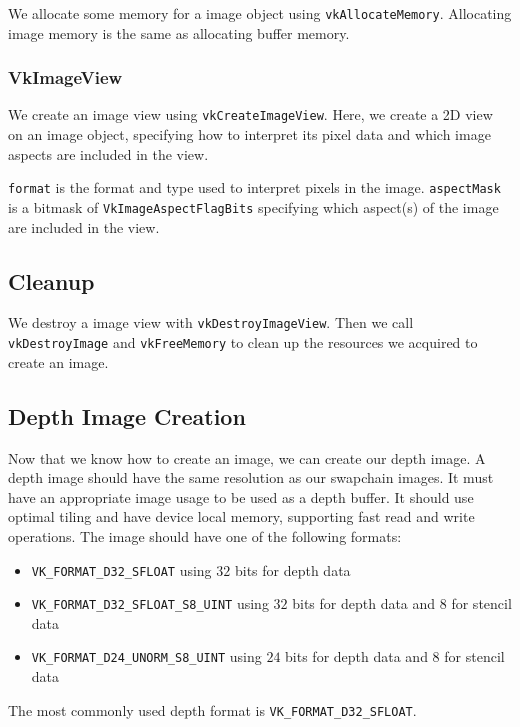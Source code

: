 We allocate some memory for a image object using \texttt{vkAllocateMemory}.
Allocating image memory is the same as allocating buffer memory.

\begin{minipage}{\linewidth}{\noindent}
    
\end{minipage}

\subsubsection{VkImageView}

We create an image view using \texttt{vkCreateImageView}.
Here, we create a 2D view on an image object, specifying
how to interpret its pixel data and which image aspects
are included in the view.

\begin{minipage}{\linewidth}{\noindent}
    
\end{minipage}

\texttt{format} is the format and type used to interpret pixels in the image.
\texttt{aspectMask} is a bitmask of \texttt{VkImageAspectFlagBits}
specifying which aspect(s) of the image are included in the view.

\subsection{Cleanup}

We destroy a image view with \texttt{vkDestroyImageView}.
Then we call \texttt{vkDestroyImage} and \texttt{vkFreeMemory}
to clean up the resources we acquired to create an image.

\subsection{Depth Image Creation}

Now that we know how to create an image, we can  create our depth image.
A depth image should have the same resolution as our swapchain images.
It must have an appropriate image usage to be used as a depth buffer.
It should use optimal tiling and have device local memory, supporting fast
read and write operations.
The image should have one of the following formats:
\begin{itemize}
\item \texttt{VK\_FORMAT\_D32\_SFLOAT} using $32$ bits for depth data
\item \texttt{VK\_FORMAT\_D32\_SFLOAT\_S8\_UINT} using $32$ bits for
depth data and $8$ for stencil data
\item \texttt{VK\_FORMAT\_D24\_UNORM\_S8\_UINT} using $24$ bits for
depth data and $8$ for stencil data
\end{itemize}
The most commonly used depth format is \texttt{VK\_FORMAT\_D32\_SFLOAT}.

